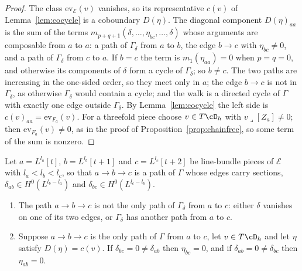 \begin{proof}
The class $\mathrm{ev}_{\mathcal{E}}(v)$ vanishes, so its representative $c(v)$ of Lemma~\ref{lem:cocycle} is a coboundary $D(\eta)$. The diagonal component $D(\eta)_{aa}$ is the sum of the terms $m_{p+q+1}(\delta,\dots,\eta_{bc},\dots,\delta)$ whose arguments are composable from $a$ to $a$: a path of $\Gamma_{\delta}$ from $a$ to $b$, the edge $b\to c$ with $\eta_{bc}\ne0$, and a path of $\Gamma_{\delta}$ from $c$ to $a$. If $b=c$ the term is $m_{1}(\eta_{aa})=0$ when $p=q=0$, and otherwise its components of $\delta$ form a cycle of $\Gamma_{\delta}$; so $b\ne c$. The two paths are increasing in the one-sided order, so they meet only in $a$; the edge $b\to c$ is not in $\Gamma_{\delta}$, as otherwise $\Gamma_{\delta}$ would contain a cycle; and the walk is a directed cycle of $\Gamma$ with exactly one edge outside $\Gamma_{\delta}$. By Lemma~\ref{lem:cocycle} the left side is $c(v)_{aa}=\mathrm{ev}_{F_{a}}(v)$. For a threefold piece choose $v\in T\cD_{h}$ with $v\lrcorner[Z_{a}]\ne0$; then $\mathrm{ev}_{F_{a}}(v)\ne0$, as in the proof of Proposition~\ref{prop:chainfree}, so some term of the sum is nonzero.
\end{proof}

\begin{lemma}\label{lem:mcrules}
Let $a=L^{l_{a}}[t]$, $b=L^{l_{b}}[t+1]$ and $c=L^{l_{c}}[t+2]$ be line-bundle pieces of $\mathcal{E}$ with $l_{a}<l_{b}<l_{c}$, so that $a\to b\to c$ is a path of $\Gamma$ whose edges carry sections, $\delta_{ab}\in H^{0}(L^{l_{b}-l_{a}})$ and $\delta_{bc}\in H^{0}(L^{l_{c}-l_{b}})$.
\begin{enumerate}[label=\textup{(\roman*)},leftmargin=2.4em,itemsep=2pt]
\item The path $a\to b\to c$ is not the only path of $\Gamma_{\delta}$ from $a$ to $c$: either $\delta$ vanishes on one of its two edges, or $\Gamma_{\delta}$ has another path from $a$ to $c$.
\item Suppose $a\to b\to c$ is the only path of $\Gamma$ from $a$ to $c$, let $v\in T\cD_{h}$ and let $\eta$ satisfy $D(\eta)=c(v)$. If $\delta_{bc}=0\ne\delta_{ab}$ then $\eta_{bc}=0$, and if $\delta_{ab}=0\ne\delta_{bc}$ then $\eta_{ab}=0$.
\end{enumerate}
\end{lemma}

